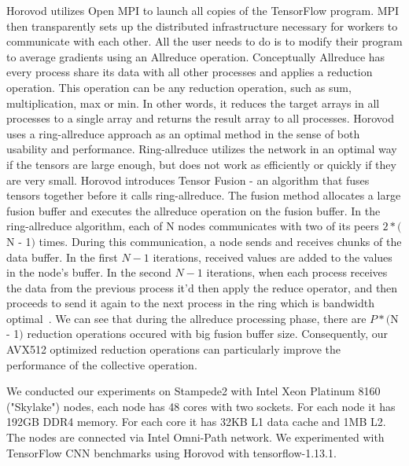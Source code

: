 \documentclass[sigconf,review]{acmart}
\begin{document}
Horovod utilizes Open MPI to launch all copies of the TensorFlow program. MPI then transparently sets up the distributed infrastructure necessary for workers to communicate with each other. All the user needs to do is to
modify their program to average gradients using an Allreduce operation. Conceptually Allreduce has every process share its data with all other processes and applies a reduction operation. This operation can be any reduction operation, such as sum, multiplication, max or min. In other words, it reduces the target arrays in all processes
to a single array and returns the result array to all processes. Horovod uses a ring-allreduce approach as an optimal method in the sense of both usability and performance.
Ring-allreduce utilizes the network in an optimal way if the tensors are large enough, but does not
work as efficiently or quickly if they are very small. Horovod introduces Tensor Fusion - an algorithm that fuses tensors together before it calls ring-allreduce. The fusion method allocates a large fusion buffer and executes the allreduce operation on the fusion buffer.
In the ring-allreduce algorithm, each of N nodes communicates with two of its
peers $2 * ($N - 1$)$ times. During this communication, a node sends and receives chunks of the data
buffer. In the first $N - 1$ iterations, received values are added to the values in the node's buffer. In
the second $N - 1$ iterations, when each process receives the data from the previous process it'd then
apply the reduce operator, and then proceeds to send it again to the next process in the ring which is bandwidth optimal~\cite{allreduce-optimal}. We can see that during the allreduce processing phase, there are $P * ($N - 1$)$ reduction operations occured with big fusion buffer size. Consequently, our AVX512 optimized reduction operations can particularly improve the performance of the collective operation.

We conducted our experiments on Stampede2 with Intel Xeon Platinum 8160 ("Skylake") nodes, each node has 48 cores with two sockets. For each node it has 192GB DDR4 memory. For each core it has 32KB L1 data cache and 1MB L2. The nodes are connected via Intel Omni-Path network.
We experimented with TensorFlow CNN benchmarks using Horovod with tensorflow-1.13.1.
\end{document}

